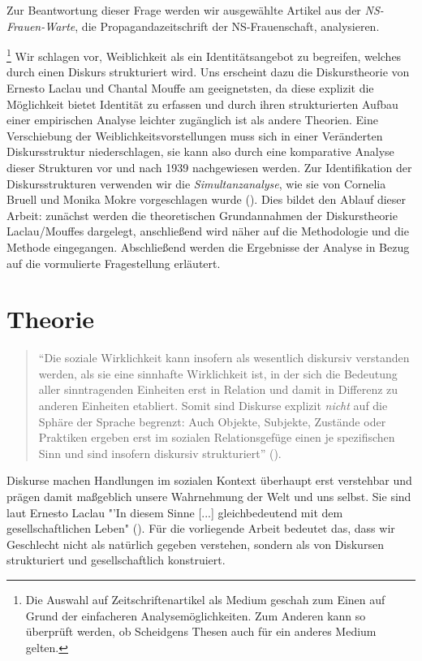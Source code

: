 \documentclass[12pt, titlepage=true, toc=bib]{scrartcl}
\begin{document}
Zur Beantwortung dieser Frage werden wir ausgewählte Artikel aus der \textit{NS-Frauen-Warte}, die Propagandazeitschrift der NS-Frauenschaft, analysieren.{\footnote{Die Auswahl auf Zeitschriftenartikel als Medium geschah zum Einen auf Grund der einfacheren Analysemöglichkeiten. Zum Anderen kann so überprüft werden, ob Scheidgens Thesen auch für ein anderes Medium gelten.} Wir schlagen vor, Weiblichkeit als ein Identitätsangebot zu begreifen, welches durch einen Diskurs strukturiert wird. Uns erscheint dazu die Diskurstheorie von Ernesto Laclau und Chantal Mouffe am geeignetsten, da diese explizit die Möglichkeit bietet Identität zu erfassen und durch ihren strukturierten Aufbau einer empirischen Analyse leichter zugänglich ist als andere Theorien. Eine Verschiebung der Weiblichkeitsvorstellungen muss sich in einer Veränderten Diskursstruktur niederschlagen, sie kann also durch eine komparative Analyse dieser Strukturen vor und nach 1939 nachgewiesen werden. Zur Identifikation der Diskursstrukturen verwenden wir die \textit{Simultanzanalyse}, wie sie von Cornelia Bruell und Monika Mokre vorgeschlagen wurde (\cite*{bruell_chancen_2006}). Dies bildet den Ablauf dieser Arbeit: zunächst werden die theoretischen Grundannahmen der Diskurstheorie Laclau/Mouffes dargelegt, anschließend wird näher auf die Methodologie und die Methode eingegangen. Abschließend werden die Ergebnisse der Analyse in Bezug auf die vormulierte Fragestellung erläutert.

\section{Theorie}

\begin{singlespace*}
\begin{quote}
"`Die soziale Wirklichkeit kann insofern als wesentlich diskursiv verstanden werden, als sie eine sinnhafte Wirklichkeit ist, in der sich die Bedeutung aller sinntragenden Einheiten erst in Relation und damit in Differenz zu anderen Einheiten etabliert. Somit sind Diskurse explizit \textit{nicht} auf die Sphäre der Sprache begrenzt: Auch Objekte, Subjekte, Zustände oder Praktiken ergeben erst im sozialen Relationsgefüge einen je spezifischen Sinn und sind insofern diskursiv strukturiert"' (\cite[9; Hervorh. im Orig.]{nonhoff_diskurs_2007-1}).
\end{quote}
\end{singlespace*}

\noindent Diskurse machen Handlungen im sozialen Kontext überhaupt erst verstehbar und prägen damit maßgeblich unsere Wahrnehmung der Welt und uns selbst. Sie sind laut Ernesto Laclau "'In diesem Sinne [...] gleichbedeutend mit dem gesellschaftlichen Leben" (\cite[29]{nonhoff_ideologie_2007}). Für die vorliegende Arbeit bedeutet das, dass wir Geschlecht nicht als natürlich gegeben verstehen, sondern als von Diskursen strukturiert und gesellschaftlich konstruiert.

}
\end{document}

